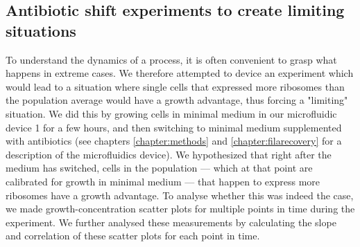 \subsection{Antibiotic shift experiments to create limiting situations}
\label{section:ribo:shiftexperiments}


To understand the dynamics of a process, it is often convenient to grasp what happens in extreme cases.
%
We therefore attempted to device an experiment which would lead to a situation where single cells that expressed more ribosomes than the population average would have a growth advantage, thus  forcing a "limiting" situation.
% 
We did this by growing cells in minimal medium in our microfluidic device 1 for a few hours, and then switching to minimal medium supplemented with antibiotics (see chapters \ref{chapter:methods} and \ref{chapter:filarecovery} for a description of the microfluidics device).
%
We hypothesized that right after the medium has switched, cells in the population --- which at that point are calibrated for growth in minimal medium --- that happen to express more ribosomes have a growth advantage.
%
To analyse whether this was indeed the case, we made growth-concentration scatter plots for multiple points in time during the experiment.
%
We further analysed these measurements by calculating the slope and correlation of these scatter plots for each point in time.


